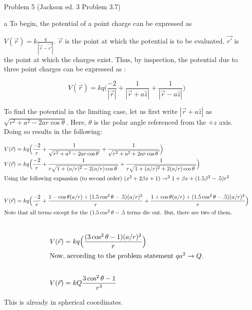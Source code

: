 \begin{homeworkProblem}{Problem 5 (Jackson ed. 3 Problem 3.7)}

\begin{homeworkSection}{a}
To begin, the potential of a point charge can be expressed as  $V(\vec{r}) = k\frac{q}{|\vec{r}-\vec{r'}|}$. $\vec{r}$ is the point at which the potential is to be evaluated. $\vec{r'}$ is the point at which the charges exist. Thus, by inspection, the potential due to three point charges can be expressed as :

\[
V(\vec{r})=kq \Big(\frac{-2}{|\vec{r}|} + \frac{1}{|\vec{r} + a\hat{z}|} + \frac{1}{|\vec{r} - a\hat{z}|} \Big)
\]

To find the potential in the limiting case, let us first write $|\vec{r} + a\hat{z}|$ as $\sqrt{r^2+a^2-2ar\cos\theta}$. Here, $\theta$ is the polar angle referenced from the $+z$ axis. Doing so results in the following:

\begin{align}
V(\vec{r})&=kq \Big(\frac{-2}{r} + \frac{1}{\sqrt{r^2+a^2-2ar\cos\theta}} + \frac{1}{\sqrt{r^2+a^2+2ar\cos\theta}} \Big) \nonumber \\
V(\vec{r})&=kq \Big(\frac{-2}{r} + \frac{1}{r\sqrt{1+(a/r)^2-2(a/r)\cos\theta}} + \frac{1}{r\sqrt{1+(a/r)^2+2(a/r)\cos\theta}} \Big) \nonumber \\
\intertext{Using the following expansion (to second order) $(x^2+2\beta x +1) \rightarrow^2 1+\beta x + (1.5\beta^2-.5)r^2$} \nonumber \\
V(\vec{r})&=kq \Big(\frac{-2}{r} + \frac{1-\cos\theta (a/r) + (1.5\cos^2\theta -.5)(a/r)^2}{r} + \frac{1+\cos\theta(a/r)+(1.5\cos^2\theta-.5)(a/r)^2}{r}\Big) \nonumber \\
\intertext{Note that all terms except for the $(1.5\cos^2\theta - .5$ terms die out. But, there are two of them.} \nonumber
\end{align}

\begin{align}
V(\vec{r})&=kq \Big(\frac{(3\cos^2\theta -1)(a/r)^2}{r} \Big) \nonumber \\
\intertext{Now, according to the problem statement $qa^2 \rightarrow Q$.} \nonumber \\
V(\vec{r})&=kQ \frac{3\cos^2\theta-1}{r^3} \nonumber
\end{align}

This is already in spherical coordinates.


\end{homeworkSection}
\end{homeworkProblem}
